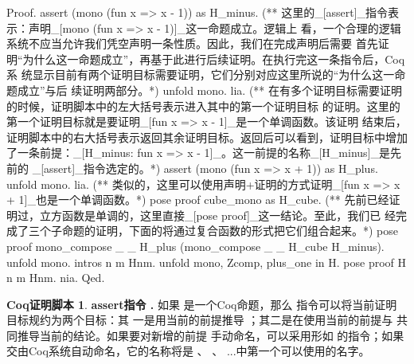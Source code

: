 \documentclass{article}[margin=1pt]
\theoremstyle{definition}
\newtheorem{CoqLtac}{Coq证明脚本}
\begin{document}
\begin{mytext65}
Proof.
  assert (mono (fun x => x - 1)) as H_minus.
  (** 这里的_[assert]_指令表示：声明_[mono (fun x => x - 1)]_这一命题成立。逻辑上
      看，一个合理的逻辑系统不应当允许我们凭空声明一条性质。因此，我们在完成声明后需要
      首先证明“为什么这一命题成立”，再基于此进行后续证明。在执行完这一条指令后，Coq系
      统显示目前有两个证明目标需要证明，它们分别对应这里所说的“为什么这一命题成立”与后
      续证明两部分。*)
  { unfold mono. lia. }
  (** 在有多个证明目标需要证明的时候，证明脚本中的左大括号表示进入其中的第一个证明目标
      的证明。这里的第一个证明目标就是要证明_[fun x => x - 1]_是一个单调函数。该证明
      结束后，证明脚本中的右大括号表示返回其余证明目标。返回后可以看到，证明目标中增加
      了一条前提：_[H_minus: fun x => x - 1]_。这一前提的名称_[H_minus]_是先前的
      _[assert]_指令选定的。*)
  assert (mono (fun x => x + 1)) as H_plus.
  { unfold mono. lia. }
  (** 类似的，这里可以使用声明+证明的方式证明_[fun x => x + 1]_也是一个单调函数。*)
  pose proof cube_mono as H_cube.
  (** 先前已经证明过，立方函数是单调的，这里直接_[pose proof]_这一结论。至此，我们已
      经完成了三个子命题的证明，下面的将通过复合函数的形式把它们组合起来。*)
  pose proof mono_compose _ _ H_plus (mono_compose _ _ H_cube H_minus).
  unfold mono.
  intros n m Hnm.
  unfold mono, Zcomp, plus_one in H.
  pose proof H n m Hnm.
  nia.
Qed.



\end{mytext65}
\noindent
\begin{CoqLtac}\textbf{ assert指令 . }
 如果  是一个Coq命题，那么  指令可以将当前证明目标规约为两个目标：其
    一是用当前的前提推导  ；其二是在使用当前的前提与  共同推导当前的结论。如果要对新增的前提  手动命名，可以采用形如  的指令；如果交由Coq系统自动命名，它的名称将是  、  、  ...中第一个可以使用的名字。

\end{CoqLtac}
\end{document}
